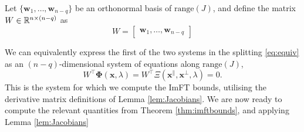 \documentclass[letterpaper, 10 pt, conference, dvipsnames]{ieeeconf}
\begin{document}
Let \(\{\mathbf{w}_1, \dots, \mathbf{w}_{n-q}\}\) be an orthonormal basis of \(\mathrm{range}(J)\), and define the matrix \(W\in\R[n \times (n-q)]\) as
\begin{equation}
    W = \begin{bmatrix} \mathbf{w}_1, \dots, \mathbf{w}_{n-q}\end{bmatrix} \label{def:W}
\end{equation}

We can equivalently express the first of the two systems in the splitting \eqref{eq:equiv} as an \((n-q)\)-dimensional system of equations along \(\mathrm{range}(J)\),
\begin{equation}
    W^\top\mathbf{\Phi}(\mathbf{x},\lambda) = W^\top\Xi(\mathbf{x}^{\parallel},\mathbf{x}^{\perp},\lambda) = 0. \label{eq:sys_for_reduction}
\end{equation}
This is the system for which we compute the ImFT bounds, utilising the derivative matrix definitions of Lemma \ref{lem:Jacobians}. We are now ready to compute the relevant quantities from Theorem \ref{thm:imftbounds}, and applying Lemma \ref{lem:Jacobians}
\end{document}
